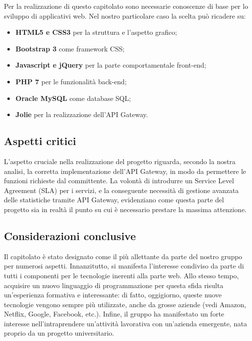 Per la realizzazione di questo capitolato sono necessarie conoscenze
di base per lo sviluppo di applicativi web. Nel nostro particolare
caso la scelta può ricadere su:
\begin{itemize}
	\item \textbf{HTML5 e CSS3} per la struttura e l'aspetto grafico;
	\item \textbf{Bootstrap 3} come framework CSS;
	\item \textbf{Javascript e jQuery} per la parte comportamentale front-end;
	\item \textbf{PHP 7} per le funzionalità back-end;
	\item \textbf{Oracle MySQL} come database SQL;
	\item \textbf{Jolie} per la realizzazione dell'API Gateway.
\end{itemize}

\subsection{Aspetti critici}

L'aspetto cruciale nella realizzazione del progetto riguarda, secondo la nostra analisi, la corretta implementazione dell'API Gateway, in modo da permettere le funzioni
richieste dal committente. La volontà di introdurre un Service Level
Agreement (SLA) per i servizi, e la conseguente necessità di gestione
avanzata delle statistiche tramite API Gateway, evidenziano come questa
parte del progetto sia in realtà il punto su cui è necessario prestare la massima attenzione.

\subsection{Considerazioni conclusive}

Il capitolato è stato designato come il più allettante da parte del
nostro gruppo per numerosi aspetti. Innanzitutto, si manifesta
l'interesse condiviso da parte di tutti i componenti per le tecnologie
inerenti alla parte web. Allo stesso tempo, acquisire un nuovo linguaggio
di programmazione per questa sfida risulta un'esperienza
formativa e interessante: di fatto, oggigiorno, queste nuove tecnologie vengono sempre più utilizzate, anche da grosse aziende (vedi Amazon, Netflix, Google, Facebook, etc.). Infine, il gruppo ha manifestato un forte interesse nell'intraprendere un'attività lavorativa con un'azienda emergente, nata proprio da un progetto universitario.